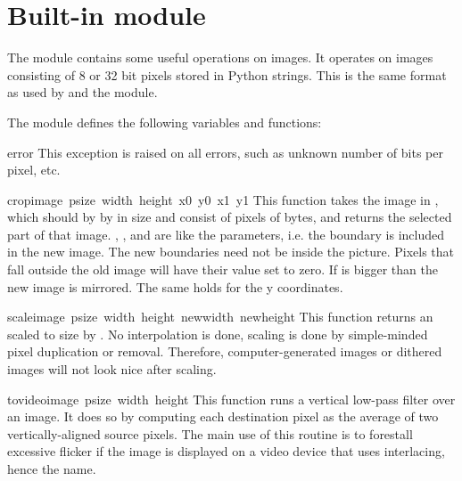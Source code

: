 \section{Built-in module }

The  module contains some useful operations on images.
It operates on images consisting of 8 or 32 bit pixels
stored in Python strings. This is the same format as used
by  and the  module.

The module defines the following variables and functions:

\renewcommand{\indexsubitem}{(in module imageop)}

\begin{excdesc}{error}
This exception is raised on all errors, such as unknown number of bits
per pixel, etc.
\end{excdesc}


\begin{funcdesc}{crop}{image\, psize\, width\, height\, x0\, y0\, x1\, y1}
This function takes the image in , which should by
 by  in size and consist of pixels of
 bytes, and returns the selected part of that image. ,
,  and  are like the 
parameters, i.e. the boundary is included in the new image.
The new boundaries need not be inside the picture. Pixels that fall
outside the old image will have their value set to zero.
If  is bigger than  the new image is mirrored. The
same holds for the y coordinates.
\end{funcdesc}

\begin{funcdesc}{scale}{image\, psize\, width\, height\, newwidth\, newheight}
This function returns an  scaled to size  by
. No interpolation is done, scaling is done by
simple-minded pixel duplication or removal. Therefore, computer-generated
images or dithered images will not look nice after scaling.
\end{funcdesc}

\begin{funcdesc}{tovideo}{image\, psize\, width\, height}
This function runs a vertical low-pass filter over an image. It does
so by computing each destination pixel as the average of two
vertically-aligned source pixels. The main use of this routine is to
forestall excessive flicker if the image is displayed on a video
device that uses interlacing, hence the name.
\end{funcdesc}

